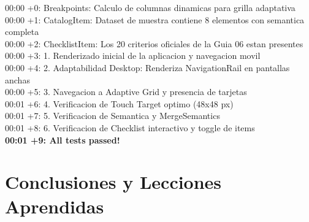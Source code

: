 \documentclass[12pt,a4paper]{article}
\begin{document}
\begin{tcolorbox}[colback=backcolour,colframe=codegreen,title=\textbf{Resultado de Ejecución de Pruebas Automatizadas}]
\ttfamily\small
00:00 +0: Breakpoints: Calculo de columnas dinamicas para grilla adaptativa\\
00:00 +1: CatalogItem: Dataset de muestra contiene 8 elementos con semantica completa\\
00:00 +2: ChecklistItem: Los 20 criterios oficiales de la Guia 06 estan presentes\\
00:00 +3: 1. Renderizado inicial de la aplicacion y navegacion movil\\
00:00 +4: 2. Adaptabilidad Desktop: Renderiza NavigationRail en pantallas anchas\\
00:00 +5: 3. Navegacion a Adaptive Grid y presencia de tarjetas\\
00:01 +6: 4. Verificacion de Touch Target optimo (48x48 px)\\
00:01 +7: 5. Verificacion de Semantica y MergeSemantics\\
00:01 +8: 6. Verificacion de Checklist interactivo y toggle de items\\
\textbf{00:01 +9: All tests passed!}
\end{tcolorbox}

\section{Conclusiones y Lecciones Aprendidas}
\end{document}
